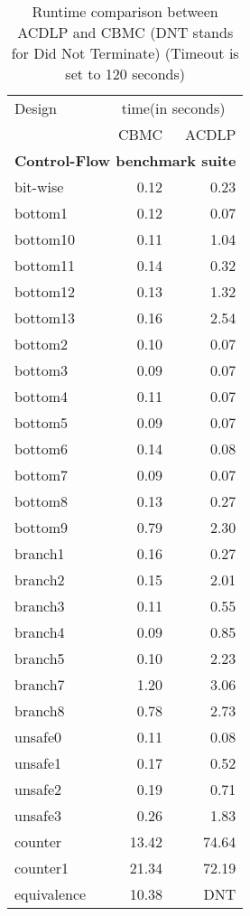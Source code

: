 \documentclass{article}
\begin{document}
\begin{table}[!b]
\begin{center}
{
\begin{tabular}{l|r|r}
\hline
  Design & \multicolumn{2}{c}{time(in seconds)} \\ 
  \cline{2-3}
  & CBMC & ACDLP \\ \hline
  \multicolumn{3}{c}{\textbf{Control-Flow benchmark suite}} \\ \hline 
  bit-wise&0.12 & 0.23
  \\ \hline 
  bottom1&0.12 & 0.07
  \\ \hline 
  bottom10&0.11 & 1.04
  \\ \hline 
  bottom11&0.14 & 0.32
  \\ \hline 
  bottom12&0.13 & 1.32
  \\ \hline 
  bottom13&0.16 & 2.54
  \\ \hline 
  bottom2&0.10 & 0.07
  \\ \hline 
  bottom3&0.09 & 0.07
  \\ \hline 
  bottom4&0.11 & 0.07
  \\ \hline 
  bottom5&0.09 & 0.07
  \\ \hline 
  bottom6&0.14 & 0.08
  \\ \hline 
  bottom7&0.09 & 0.07
  \\ \hline 
  bottom8&0.13 & 0.27
  \\ \hline 
  bottom9&0.79 & 2.30
  \\ \hline 
  branch1&0.16 & 0.27
  \\ \hline 
  branch2&0.15 & 2.01
  \\ \hline 
  branch3&0.11 & 0.55
  \\ \hline 
  branch4&0.09 & 0.85
  \\ \hline 
  branch5&0.10 & 2.23
  \\ \hline 
  branch7&1.20 & 3.06
  \\ \hline 
  branch8&0.78 & 2.73
  \\ \hline 
  unsafe0&0.11 & 0.08
  \\ \hline 
  unsafe1&0.17 & 0.52
  \\ \hline 
  unsafe2&0.19 & 0.71
  \\ \hline 
  unsafe3&0.26 & 1.83
  \\ \hline 
  counter&13.42 & 74.64
  \\ \hline 
  counter1&21.34 & 72.19
  \\ \hline 
  equivalence&10.38 & DNT
  \\ \hline 
\end{tabular}
}
\end{center}
\caption{Runtime comparison between ACDLP and CBMC (DNT stands for Did Not Terminate)
(Timeout is set to 120 seconds)}
\label{solver2}
\end{table}
\end{document}
